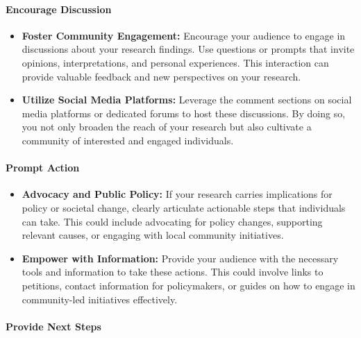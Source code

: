 \documentclass[
]{book}
\begin{document}
\hypertarget{encourage-discussion}{%
\paragraph{Encourage Discussion}\label{encourage-discussion}}

\begin{itemize}
\item
  \textbf{Foster Community Engagement:} Encourage your audience to engage in discussions about your research findings. Use questions or prompts that invite opinions, interpretations, and personal experiences. This interaction can provide valuable feedback and new perspectives on your research.
\item
  \textbf{Utilize Social Media Platforms:} Leverage the comment sections on social media platforms or dedicated forums to host these discussions. By doing so, you not only broaden the reach of your research but also cultivate a community of interested and engaged individuals.
\end{itemize}

\hypertarget{prompt-action}{%
\paragraph{Prompt Action}\label{prompt-action}}

\begin{itemize}
\item
  \textbf{Advocacy and Public Policy:} If your research carries implications for policy or societal change, clearly articulate actionable steps that individuals can take. This could include advocating for policy changes, supporting relevant causes, or engaging with local community initiatives.
\item
  \textbf{Empower with Information:} Provide your audience with the necessary tools and information to take these actions. This could involve links to petitions, contact information for policymakers, or guides on how to engage in community-led initiatives effectively.
\end{itemize}

\hypertarget{provide-next-steps}{%
\paragraph{Provide Next Steps}\label{provide-next-steps}}
\end{document}

